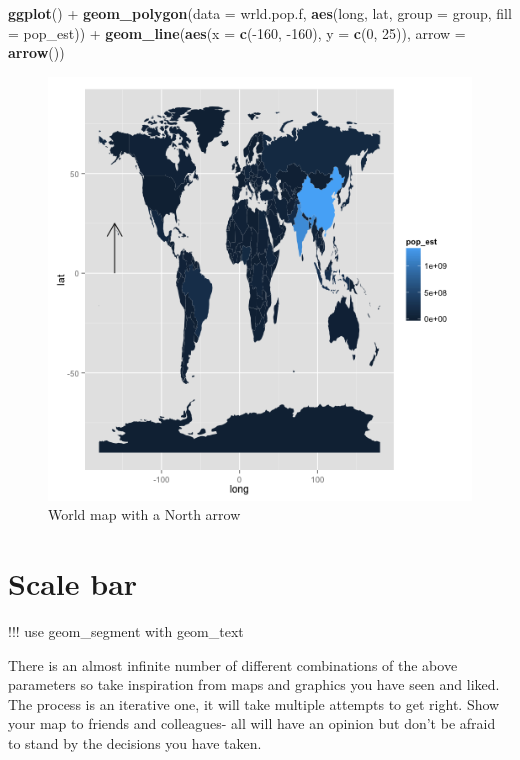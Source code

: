 \documentclass[]{article}
\makeatletter
\newenvironment{Shaded}{}{}
\newcommand{\KeywordTok}[1]{\textcolor[rgb]{0.00,0.44,0.13}{\textbf{{#1}}}}
\newcommand{\DataTypeTok}[1]{\textcolor[rgb]{0.56,0.13,0.00}{{#1}}}
\newcommand{\DecValTok}[1]{\textcolor[rgb]{0.25,0.63,0.44}{{#1}}}
\newcommand{\NormalTok}[1]{{#1}}
\def\maxwidth{\ifdim\Gin@nat@width>\linewidth\linewidth
\else\Gin@nat@width\fi}
\let\Oldincludegraphics\includegraphics
\renewcommand{\includegraphics}[1]{\Oldincludegraphics[width=\maxwidth]{#1}}
\makeatother
\begin{document}
\begin{Shaded}
\begin{Highlighting}[]
\KeywordTok{ggplot}\NormalTok{() + }\KeywordTok{geom_polygon}\NormalTok{(}\DataTypeTok{data =} \NormalTok{wrld.pop.f, }\KeywordTok{aes}\NormalTok{(long, lat, }\DataTypeTok{group =} \NormalTok{group, }\DataTypeTok{fill =} \NormalTok{pop_est)) + }
    \KeywordTok{geom_line}\NormalTok{(}\KeywordTok{aes}\NormalTok{(}\DataTypeTok{x =} \KeywordTok{c}\NormalTok{(-}\DecValTok{160}\NormalTok{, -}\DecValTok{160}\NormalTok{), }\DataTypeTok{y =} \KeywordTok{c}\NormalTok{(}\DecValTok{0}\NormalTok{, }\DecValTok{25}\NormalTok{)), }\DataTypeTok{arrow =} \KeywordTok{arrow}\NormalTok{())}
\end{Highlighting}
\end{Shaded}
\begin{figure}[htbp]
\centering
\includegraphics{figure/World_map_with_a_North_arrow.png}
\caption{World map with a North arrow}
\end{figure}

\section{Scale bar}

!!! use geom\_segment with geom\_text

There is an almost infinite number of different combinations of the
above parameters so take inspiration from maps and graphics you have
seen and liked. The process is an iterative one, it will take multiple
attempts to get right. Show your map to friends and colleagues- all will
have an opinion but don't be afraid to stand by the decisions you have
taken.
\end{document}
